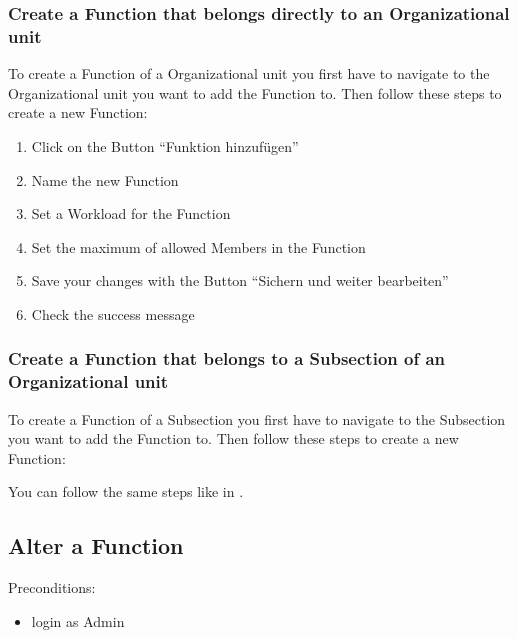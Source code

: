 \documentclass[letterpaper,10pt,english]{sphinxmanual}
\begin{document}
\subsubsection{Create a Function that belongs directly to an Organizational unit}
\label{\detokenize{masterUserDoc:create-a-function-that-belongs-directly-to-an-organizational-unit}}\label{\detokenize{masterUserDoc:createfunctionorganizationalunit}}
To create a Function of a Organizational unit you first have to navigate
to the Organizational unit you want to add the Function to. Then follow these
steps to create a new Function:
\begin{enumerate}
%
\item {} 
Click on the Button “Funktion hinzufügen”

\item {} 
Name the new Function

\item {} 
Set a Workload for the Function

\item {} 
Set the maximum of allowed Members in the Function

\item {} 
Save your changes with the Button “Sichern und weiter bearbeiten”

\item {} 
Check the success message

\end{enumerate}

\noindent{}


\subsubsection{Create a Function that belongs to a Subsection of an Organizational unit}
\label{\detokenize{masterUserDoc:create-a-function-that-belongs-to-a-subsection-of-an-organizational-unit}}
To create a Function of a Subsection you first have to navigate to the Subsection
you want to add the Function to. Then follow these steps to create a new Function:

You can follow the same steps like in .

\noindent{}


\subsection{Alter a Function}
\label{\detokenize{masterUserDoc:alter-a-function}}
Pre\sphinxhyphen{}conditions:
\begin{itemize}
\item {} 
login as Admin

\end{itemize}
\end{document}
